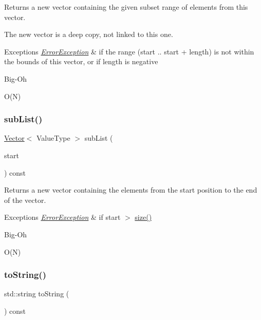 Returns a new vector containing the given subset range of elements from this vector. 

The new vector is a deep copy, not linked to this one. 
\begin{DoxyExceptions}{Exceptions}
{\em \mbox{\hyperlink{classErrorException}{Error\+Exception}}} & if the range (start .. start + length) is not within the bounds of this vector, or if length is negative \\
\hline
\end{DoxyExceptions}
\begin{DoxyRefDesc}{Big-\/\+Oh}
\item[\mbox{\hyperlink{BigOh__BigOh000132}{Big-\/\+Oh}}]O(\+N) \end{DoxyRefDesc}
\mbox{\label{classVector_ae03d3b2b1d798ec0490b8adc2ff1abd0}} 
\subsubsection{\texorpdfstring{sub\+List()}{subList()}\hspace{0.1cm}{\footnotesize\ttfamily [2/2]}}
{\footnotesize\ttfamily \mbox{\hyperlink{classVector}{Vector}}$<$ Value\+Type $>$ sub\+List (\begin{DoxyParamCaption}\item[{int}]{start }\end{DoxyParamCaption}) const}



Returns a new vector containing the elements from the start position to the end of the vector. 


\begin{DoxyExceptions}{Exceptions}
{\em \mbox{\hyperlink{classErrorException}{Error\+Exception}}} & if start $>$ \mbox{\hyperlink{classVector_af9593d4a5ff4274efaf429cb4f9e57cc}{size()}} \\
\hline
\end{DoxyExceptions}
\begin{DoxyRefDesc}{Big-\/\+Oh}
\item[\mbox{\hyperlink{BigOh__BigOh000133}{Big-\/\+Oh}}]O(\+N) \end{DoxyRefDesc}
\mbox{\label{classVector_a1fe5121d6528fdea3f243321b3fa3a49}} 
\subsubsection{\texorpdfstring{to\+String()}{toString()}}
{\footnotesize\ttfamily std\+::string to\+String (\begin{DoxyParamCaption}{ }\end{DoxyParamCaption}) const}



